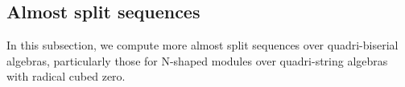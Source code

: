 \documentclass[10pt]{amsart}
\newtheorem{Lemma}[Theo]{Lemma}
\theoremstyle{definition}
\newcommand{\mmod}{{\rm mod}}
\newcommand{\rad}{{\rm rad}\hspace{.5pt}}
\newcommand{\soc}{{\rm soc}\hspace{.5pt}}
\newcommand{\ntop}{{\rm top}\hspace{.5pt}}
\newcommand{\hp}{\hspace{.5pt}}
\begin{document}
\vspace{-2pt}

\subsection{\sc Almost split sequences} In this subsection, we compute more almost split sequences over quadri-biserial algebras, particularly those for N-shaped modules over quadri-string algebras with radical cubed zero. \vspace{-1pt}


\end{document}
